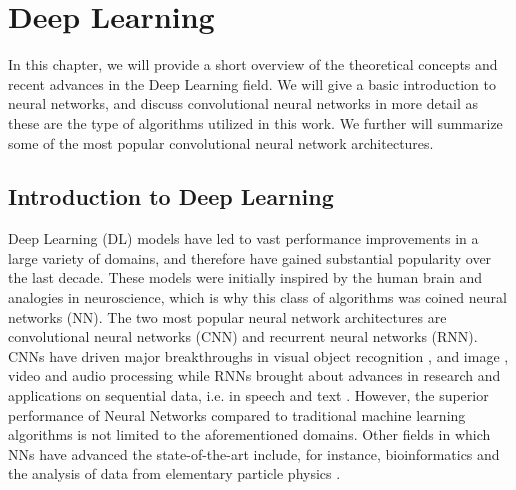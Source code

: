 
\chapter{Deep Learning} %

\label{Chapter2} %


In this chapter, we will provide a short overview of the theoretical concepts and recent advances in the Deep Learning field. We will give a basic introduction to neural networks, and discuss convolutional neural networks in more detail as these are the type of algorithms utilized in this work. We further will summarize some of the most popular convolutional neural network architectures.




\section{Introduction to Deep Learning}

Deep Learning (DL) models have led to vast performance improvements in a large variety of domains, and therefore have gained substantial popularity over the last decade. These models were initially inspired by the human brain and analogies in neuroscience, which is why this class of algorithms was coined neural networks (NN). The two most popular neural network architectures are convolutional neural networks (CNN) and recurrent neural networks (RNN). CNNs have driven major breakthroughs in visual object recognition \parencite{krizhevsky2012}, and image \parencite{zhang2015}, video \parencite{tompson2014} and audio \parencite{hinton2012} processing while RNNs brought about advances in research and applications on sequential data, i.e. in speech and text \parencite{collobert2011}. However, the superior performance of Neural Networks compared to traditional machine learning algorithms is not limited to the aforementioned domains. Other fields in which NNs have advanced the state-of-the-art include, for instance, bioinformatics \parencite{junshui2015} and the analysis of data from elementary particle physics \parencite{ciodaroc2012}.

